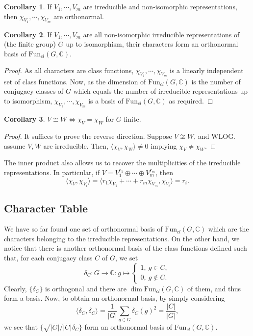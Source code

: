 \documentclass[]{article}
\theoremstyle{definition}
\newtheorem{corollary}{Corollary}[theorem]
\theoremstyle{definition}
\begin{document}
\begin{corollary}
  If \(V_1, \cdots, V_m\) are irreducible and non-isomorphic representations, 
  then \(\chi_{V_1}, \cdots, \chi_{V_m}\) are orthonormal.
\end{corollary}

\begin{corollary}
  If \(V_1, \cdots, V_m\) are all non-isomorphic irreducible representations of 
  (the finite group) \(G\) up to isomorphism, their characters form an orthonormal 
  basis of \(\text{Fun}_{cl}(G, \mathbb{C})\).
\end{corollary}
\begin{proof}
  As all characters are class functions, \(\chi_{V_1}, \cdots, \chi_{V_m}\) 
  is a linearly independent set of class functions. Now, as the dimension of 
  \(\text{Fun}_{cl}(G, \mathbb{C})\) is the number of conjugacy classes of 
  \(G\) which equals the number of irreducible representations up to isomorphism, 
  \(\chi_{V_1}, \cdots, \chi_{V_m}\) is a basis of 
  \(\text{Fun}_{cl}(G, \mathbb{C})\) as required.
\end{proof}

\begin{corollary}
  \(V \cong W \iff \chi_V = \chi_W\) for \(G\) finite. 
\end{corollary}
\begin{proof}
  It suffices to prove the reverse direction. Suppose \(V \not\cong W\), and 
  WLOG. assume \(V, W\) are irreducible. Then,  
  \(\langle \chi_V, \chi_W \rangle \neq 0\) implying \(\chi_V \neq \chi_W\).
\end{proof}

The inner product also allows us to recover the multiplicities of the 
irreducible representations. In particular, if \(V = V_1^{r_1} \oplus \cdots \oplus 
V_m^{r_m}\), then 
\[\langle \chi_V, \chi_{V_i} \rangle = 
  \langle r_1\chi_{V_1} + \cdots + r_m \chi_{V_m}, \chi_{V_i} \rangle = r_i.\]

\subsection{Character Table}

We have so far found one set of orthonormal basis of \(\text{Fun}_{cl}(G, \mathbb{C})\)
which are the characters belonging to the irreducible representations. On the other 
hand, we notice that there is another orthonormal basis of the class functions 
defined such that, for each conjugacy class \(C\) of \(G\), we set
\[\delta_C : G \to \mathbb{C} : g \mapsto 
  \begin{cases}
    1, \ g \in C,\\
    0, \ g \not\in C.
  \end{cases}\]
Clearly, \(\{\delta_C\}\) is orthogonal and there are 
\(\dim \text{Fun}_{cl}(G, \mathbb{C})\) of them, and thus form a basis. Now, 
to obtain an orthonormal basis, by simply considering 
\[\langle \delta_C, \delta_C \rangle = 
  \frac{1}{|G|}\sum_{g \in G} \delta_C(g)^2
  = \frac{|C|}{|G|},\]
we see that \(\{\sqrt{|G| / |C|} \delta_C\}\) form an orthonormal basis of 
\(\text{Fun}_{cl}(G, \mathbb{C})\).
\end{document}
